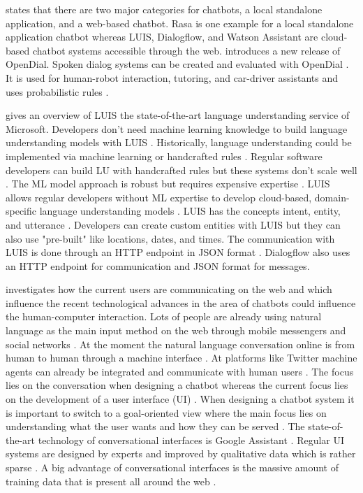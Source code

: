\citet{kane2016role} states that there are two major categories for chatbots, a local standalone application, and a web-based chatbot. Rasa is one example for a local standalone application chatbot whereas LUIS, Dialogflow, and Watson Assistant are cloud-based chatbot systems accessible through the web.
\citet{lison2016opendial} introduces a new release of OpenDial. Spoken dialog systems can be created and evaluated with OpenDial \cite{lison2016opendial}. It is used for human-robot interaction, tutoring, and car-driver assistants and uses probabilistic rules \cite{lison2016opendial}.

\citet{luis2015williams} gives an overview of LUIS the state-of-the-art language understanding service of Microsoft.
Developers don't need machine learning knowledge to build language understanding models with LUIS \cite{luis2015williams}.
Historically, language understanding could be implemented via machine learning or handcrafted rules \cite{luis2015williams}.
Regular software developers can build LU with handcrafted rules but these systems don't scale well \cite{luis2015williams}.
The ML model approach is robust but requires expensive expertise \cite{luis2015williams}. 
LUIS allows regular developers without ML expertise to develop cloud-based, domain-specific language understanding models \cite{luis2015williams}.
LUIS has the concepts intent, entity, and utterance \cite{luis2015williams}.
Developers can create custom entities with LUIS but they can also use "pre-built" like locations, dates, and times.
The communication with LUIS is done through an HTTP endpoint in JSON format \cite{luis2015williams}. 
Dialogflow also uses an HTTP endpoint for communication and JSON format for messages. 

\citet{folstad2017chatbots} investigates how the current users are communicating on the web and which influence the recent technological advances in the area of chatbots could influence the human-computer interaction.
Lots of people are already using natural language as the main input method on the web through mobile messengers and social networks \cite{folstad2017chatbots}. At the moment the natural language conversation online is from human to human through a machine interface \cite{folstad2017chatbots}. At platforms like Twitter machine agents can already be integrated and communicate with human users \cite{folstad2017chatbots}. The focus lies on the conversation when designing a chatbot whereas the current focus lies on the development of a user interface (UI) \cite{folstad2017chatbots}.
When designing a chatbot system it is important to switch to a goal-oriented view where the main focus lies on understanding what the user wants and how they can be served \cite{folstad2017chatbots}.
The state-of-the-art technology of conversational interfaces is Google Assistant \cite{folstad2017chatbots}.
Regular UI systems are designed by experts and improved by qualitative data which is rather sparse \cite{folstad2017chatbots}.
A big advantage of conversational interfaces is the massive amount of training data that is present all around the web \cite{folstad2017chatbots}. 

